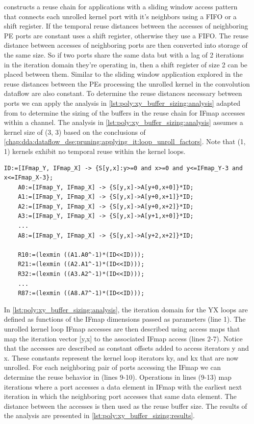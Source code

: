 \cite{meeus} constructs a reuse chain for applications with a sliding window
access pattern that connects each unrolled kernel port with it's neighbors using
a FIFO or a shift register. If the temporal reuse distances between the accesses
of neighboring PE ports are constant \cite{meeus} uses a shift register,
otherwise they use a FIFO. The reuse distance between accesses of neighboring
ports are then converted into storage of the same size. So if two ports share
the same data but with a lag of 2 iterations in the iteration domain they're
operating in, then a shift register of size 2 can be placed between them.
Similar to the sliding window application explored in \cite{meeus} the reuse
distances between the PEs processing the unrolled kernel in the convolution
dataflow are also constant. To determine the reuse distances necessary between
ports we can apply the analysis in \autoref{lst:poly:xy_buffer_sizing:analysis}
adapted from \cite{meeus} to determine the sizing of the buffers in the reuse
chain for IFmap accesses within a channel. The analysis in
\autoref{lst:poly:xy_buffer_sizing:analysis} assumes a kernel size of (3, 3) based
on the conclusions of
\autoref{chap:dda:dataflow_dse:pruning:applying_it:loop_unroll_factors}. Note
that (1, 1) kernels exhibit no temporal reuse within the kernel loops.  

\begin{lstlisting}[caption=Determining buffer sizes in 3x3 convolutions, label={lst:poly:xy_buffer_sizing:analysis}]
    ID:=[IFmap_Y, IFmap_X] -> {S[y,x]:y>=0 and x>=0 and y<=IFmap_Y-3 and x<=IFmap_X-3};
    A0:=[IFmap_Y, IFmap_X] -> {S[y,x]->A[y+0,x+0]}*ID;
    A1:=[IFmap_Y, IFmap_X] -> {S[y,x]->A[y+0,x+1]}*ID;
    A2:=[IFmap_Y, IFmap_X] -> {S[y,x]->A[y+0,x+2]}*ID;
    A3:=[IFmap_Y, IFmap_X] -> {S[y,x]->A[y+1,x+0]}*ID;
    ...
    A8:=[IFmap_Y, IFmap_X] -> {S[y,x]->A[y+2,x+2]}*ID;

    R10:=(lexmin ((A1.A0^-1)*(ID<<ID)));
    R21:=(lexmin ((A2.A1^-1)*(ID<<ID)));
    R32:=(lexmin ((A3.A2^-1)*(ID<<ID)));
    ...
    R87:=(lexmin ((A8.A7^-1)*(ID<<ID)));
\end{lstlisting}

In \autoref{lst:poly:xy_buffer_sizing:analysis}, the iteration domain for the YX
loops are defined as functions of the IFmap dimensions passed as parameters (line 1).
The unrolled kernel loop IFmap accesses are then described using access maps
that map the iteration vector [y,x] to the associated IFmap access (lines 2-7).
Notice that the accesses are described as constant offsets added to access iterators y
and x. These constants represent the kernel loop iterators ky, and kx that are now
unrolled. For each neighboring pair of ports accessing the IFmap we can
determine the reuse behavior in (lines 9-10). Operations in lines (9-13) map
iterations where a port accesses a data element in IFmap with the earliest next
iteration in which the neighboring port accesses that same data element. The
distance between the accesses is then used as the reuse buffer size. The results
of the analysis are presented in \autoref{lst:poly:xy_buffer_sizing:results}.

